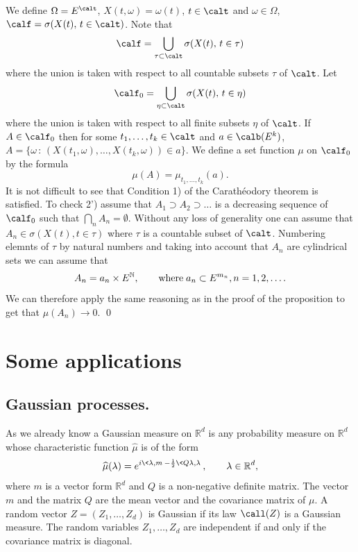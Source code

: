 \documentclass[preprint]{imsart}
\def\N{\mathbb N}
\def\R{\mathbb R}
\begin{document}
{
We define $\Omega=E^\calt$, $X(t,\omega)=\omega(t)$,
$t\in\calt$ and $\omega\in\Omega$,
$\calf=\sigma(X(t),\, t\in\calt )$. Note that
$$
\calf= \bigcup_{\tau\subset\calt}\sigma
(X(t),\, t\in\tau )
$$
where the union is taken with respect to all countable
subsets $\tau$ of $\calt$. Let
$$
\calf_0= \bigcup_{\eta\subset\calt}\sigma
(X(t),\, t\in\eta )
$$
where the union is taken with respect to all finite
subsets $\eta$ of $\calt$. If $A\in\calf_0$ then for
some $t_1,\ldots,t_k\in\calt$ and $a\in \calb(E^k)$,
$A=\{\omega \, :\,
(X(t_1,\omega),\ldots,X(t_k,\omega))\in a\}$. We define
a set function $\mu$ on $\calf_0$ by the formula
$$
\mu(A) = \mu_{t_1,\ldots,t_k}(a).
$$
It is not difficult to see that Condition 1)  of the
Carath\'eodory theorem is satisfied. To check 2')
assume that $A_1\supset A_2\supset\ldots$ is a
decreasing sequence of $\calf_0$ such that
$\bigcap_nA_n=\emptyset$. Without any loss of
generality one can assume that
$A_n\in\sigma(X(t),t\in\tau)$ where $\tau$ is a
countable subset of $\calt$. Numbering elemnts of
$\tau$ by natural numbers and taking into account that
$A_n$ are cylindrical sets we can assume that
$$
A_n=a_n\times E^{\N},\qquad {\rm where\;} a_n\subset
E^{m_n},n=1,2,\ldots.
$$
We can therefore apply the same reasoning as in the
proof of the proposition to get that $\mu(A_n)\to 0$.
\qed



\section{Some applications}

\subsection{Gaussian processes.}

As we already know a  Gaussian measure on $\R^d$ is any probability measure on $\R^d$
whose characteristic function
$\widehat{\mu}$ is of the form
$$
\widehat{\mu} (\lambda)=e^{i\<\lambda , m\>-\frac{1}{2}
\<Q\lambda,\lambda\>},\qquad \lambda\in\R^d,
$$
where $m$ is a vector form $\R^d$ and $Q$ is a non-negative
definite matrix. The vector $m$ and the matrix $Q$ are the mean vector and the covariance matrix of $\mu$.
A random vector $Z=(Z_1,\ldots,Z_d)$ is Gaussian if its law
$\call(Z)$ is a Gaussian measure. The
random variables $Z_1,\ldots,Z_d$ are independent if and only if
the covariance matrix is diagonal.
\vspace{3mm}

}
\end{document}
